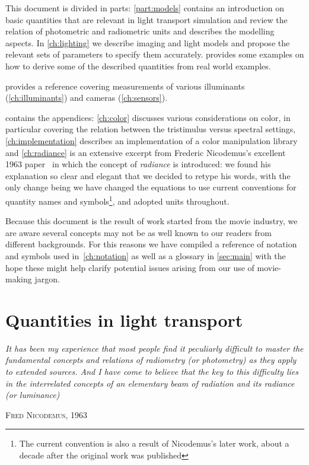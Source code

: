 This document is divided in parts: \cref{part:models}
contains an introduction on basic quantities that are relevant in
light transport simulation and review the relation of photometric and
radiometric units and describes the modelling aspects. In 
\cref{ch:lighting} we describe imaging and light models and propose the
relevant sets of parameters to specify them accurately.  
 provides some examples on how to derive some of
the described quantities from real world examples.

 provides a reference covering measurements of various 
illuminants (\cref{ch:illuminants}) and cameras (\cref{ch:sensors}).

 contains the appendices: \cref{ch:color} discusses
various considerations on color, in particular covering the relation between 
the tristimulus versus spectral settings,
\cref{ch:implementation} describes an implementation of a color manipulation library
and \cref{ch:radiance} is an extensive excerpt from Frederic Nicodemus's 
excellent 1963 paper~\cite{nicodemus63} in which the concept of \textsl{\gls{radiance}}
is introduced: we found his explanation so clear and elegant that we decided to retype 
his words, with the only change being we have changed the equations to use current 
conventions for quantity names and symbols\footnote{
	The current convention is also a result of Nicodemus's later work,
	about a decade after the original work was published}, 
and adopted  units throughout.

Because this document is the result of work started from the movie industry, 
we are aware several concepts may not be as well known to our readers from different backgrounds. 
For this reasons we have compiled a reference of notation and symbols used in~\cref{ch:notation} 
as well as a glossary in \cref{sec:main} with the hope these might help clarify potential issues arising 
from our use of movie-making jargon.

\section{Quantities in light transport}
\epigraph{%
	\emph{It has been	my experience that most people find it peculiarly difficult to master 
	the fundamental concepts and relations of radiometry (or photometry) as they apply 
	to extended sources. And I have come to believe that the key to this difficulty 
	lies in the interrelated concepts of an elementary beam of radiation and its 
	radiance (or luminance)}}{\textsc{Fred Nicodemus}, 1963}

